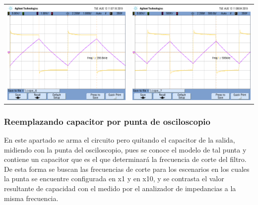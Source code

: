 \begin{tabular}{c c}
	\includegraphics[scale=0.21]{../Mediciones/Fotos/scope_6.png} & \includegraphics[scale=0.21]{../Mediciones/Fotos/scope_7.png}	
\end{tabular}

\subsubsection*{Reemplazando capacitor por punta de osciloscopio}

En este apartado se arma el circuito pero quitando el capacitor de la salida, midiendo con la punta del osciloscopio, pues se conoce el modelo de tal punta y contiene un capacitor que es el que determinar\'a la frecuencia de corte del filtro. De esta forma se buscan las frecuencias de corte para los escenarios en los cuales la punta se encuentre configurada en x1 y en x10, y se contrasta el valor resultante de capacidad con el medido por el analizador de impedancias a la misma frecuencia.

